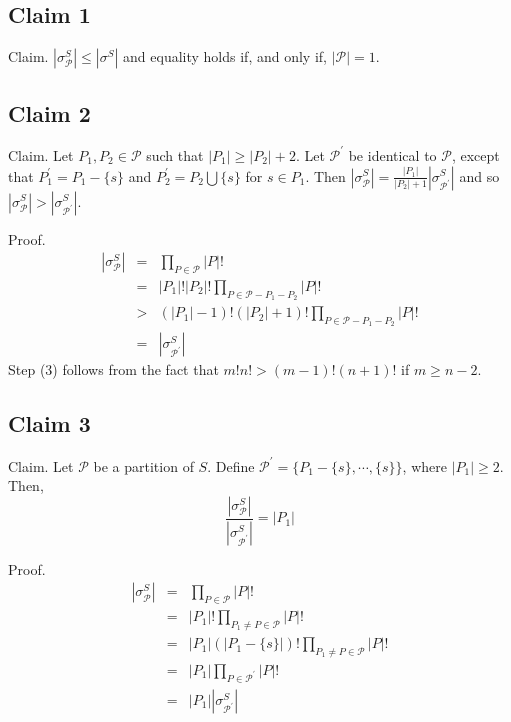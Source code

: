\documentclass{article}
\begin{document}
\subsection{Claim 1}
Claim. $|\sigma^S_{\mathcal{P}}| \leq |\sigma^S|$ and equality holds if, and only if, $|\mathcal{P}| = 1$.


\subsection{Claim 2}
Claim. Let $P_1, P_2 \in \mathcal{P}$ such that $|P_1| \geq |P_2| + 2$. 
Let $\mathcal{P}^{\prime}$ be identical to 
$\mathcal{P}$, except that $P^{\prime}_1 = P_1 -\{s\}$ and $P^{\prime}_2 = P_2 \bigcup \{s\}$ for $s \in P_1$.
Then $|\sigma^S_{\mathcal{P}}| = \frac{|P_1|}{|P_2| + 1}|\sigma^S_{\mathcal{P^{\prime}}}|$ and so
$|\sigma^S_{\mathcal{P}}| > |\sigma^S_{\mathcal{P^{\prime}}}|$.

Proof. 
\begin{eqnarray}
|\sigma^S_{\mathcal{P}}| &=& \prod_{P \in \mathcal{P}} |P|! \\
&=& |P_1|!|P_2|!\prod_{P \in \mathcal{P}-P_1-P_2} |P|! \\
&>& (|P_1|-1)!(|P_2|+1)!\prod_{P \in \mathcal{P}-P_1-P_2} |P|! \\
& = & 
|\sigma^S_{\mathcal{P^{\prime}}}|
\end{eqnarray}
Step (3) follows from the fact that
$m!n! > (m-1)!(n+1)!$ if $m \geq n-2$.

\subsection{Claim 3}
Claim. Let $\mathcal{P}$ be a partition of $S$.
Define $\mathcal{P}^{\prime} = \{ P_1 - \{ s \} , \cdots, \{s\} \}$, where $|P_1| \geq 2$. Then,
$$
\frac{|\sigma_{\mathcal{P}}^S|}
{|\sigma_{\mathcal{P}^{\prime}}^S|} = |P_1|
$$

Proof.
\begin{eqnarray}
|\sigma^S_{\mathcal{P}}| & = & \prod_{P \in \mathcal{P}} |P|! \\
& = & |P_1|! \prod_{P_1 \neq P \in \mathcal{P}} |P|! \\
& = & |P_1| (|P_1 - \{s\}|)! \prod_{P_1 \neq P \in \mathcal{P}} |P|! \\
& = & |P_1| \prod_{P \in \mathcal{P}^{\prime}} |P|! \\
& = & |P_1| |\sigma^S_{\mathcal{P}^{\prime}}| \\
\end{eqnarray}
\end{document}

